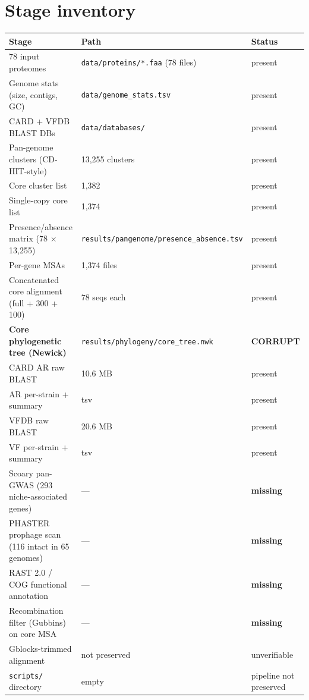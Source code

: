 \documentclass[11pt]{article}
\begin{document}
\section{Stage inventory}
\begin{small}
\begin{longtable}{p{5.3cm} p{6.5cm} p{2.5cm}}
\toprule
Stage & Path & Status \\ \midrule
78 input proteomes & \texttt{data/proteins/*.faa} (78 files) & present \\
Genome stats (size, contigs, GC) & \texttt{data/genome\_stats.tsv} & present \\
CARD + VFDB BLAST DBs & \texttt{data/databases/} & present \\
Pan-genome clusters (CD-HIT-style) & 13{,}255 clusters & present \\
Core cluster list & 1{,}382 & present \\
Single-copy core list & 1{,}374 & present \\
Presence/absence matrix (78 $\times$ 13{,}255) & \texttt{results/pangenome/presence\_absence.tsv} & present \\
Per-gene MSAs & 1{,}374 files & present \\
Concatenated core alignment (full + 300 + 100) & 78 seqs each & present \\
\textbf{Core phylogenetic tree (Newick)} & \texttt{results/phylogeny/core\_tree.nwk} & \textbf{CORRUPT} \\
CARD AR raw BLAST & 10.6 MB & present \\
AR per-strain + summary & tsv & present \\
VFDB raw BLAST & 20.6 MB & present \\
VF per-strain + summary & tsv & present \\
Scoary pan-GWAS (293 niche-associated genes) & --- & \textbf{missing} \\
PHASTER prophage scan (116 intact in 65 genomes) & --- & \textbf{missing} \\
RAST 2.0 / COG functional annotation & --- & \textbf{missing} \\
Recombination filter (Gubbins) on core MSA & --- & \textbf{missing} \\
Gblocks-trimmed alignment & not preserved & unverifiable \\
\texttt{scripts/} directory & empty & pipeline not preserved \\
\bottomrule
\end{longtable}
\end{small}
\end{document}
